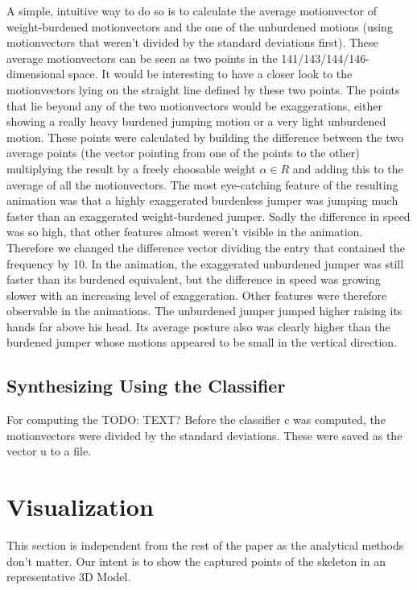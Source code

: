 \documentclass[a4paper]{article}
\begin{document}
A simple, intuitive way to do so is to calculate the average motionvector of weight-burdened motionvectors and the one of the unburdened motions (using motionvectors that weren't divided by the standard deviations first).
These average motionvectors can be seen as two points in the 141/143/144/146-dimensional space.
It would be interesting to have a closer look to the motionvectors lying on the straight line defined by these two points.
The points that lie beyond any of the two motionvectors would be exaggerations, either showing a really heavy burdened jumping motion or a very light unburdened motion.
These points were calculated by building the difference between the two average points (the vector pointing from one of the points to the other) multiplying the result by a freely choosable weight $\alpha \in R$ and adding this to the average of all the motionvectors.
The most eye-catching feature of the resulting animation was that a highly exaggerated burdenless jumper was jumping much faster than an exaggerated weight-burdened jumper.
Sadly the difference in speed was so high, that other features almost weren't visible in the animation.
Therefore we changed the difference vector dividing the entry that contained the frequency by 10.
In the animation, the exaggerated unburdened jumper was still faster than its burdened equivalent, but the difference in speed was growing slower with an increasing level of exaggeration.
Other features were therefore observable in the animations.
The unburdened jumper jumped higher raising its hands far above his head.
Its average posture also was clearly higher than the burdened jumper whose motions appeared to be small in the vertical direction.

\subsection{Synthesizing Using the Classifier}

For computing the TODO: TEXT?
Before the classifier c was computed, the motionvectors were divided by the standard deviations. These were saved as the vector u to a file.

\section{Visualization}

This section is independent from the rest of the paper as the analytical methods don't matter.
Our intent is to show the captured points of the skeleton in an representative 3D Model.
\end{document}
